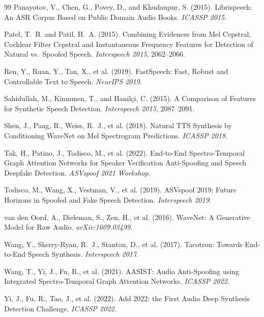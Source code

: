 \documentclass[12pt, a4paper, oneside]{report}
\begin{document}
\begin{thebibliography}{99}
Panayotov, V., Chen, G., Povey, D., and Khudanpur, S. (2015).
\newblock Librispeech: An ASR Corpus Based on Public Domain Audio Books.
\newblock \textit{ICASSP 2015}.

Patel, T.~B. and Patil, H.~A. (2015).
\newblock Combining Evidences from Mel Cepstral, Cochlear Filter Cepstral and Instantaneous Frequency Features for Detection of Natural vs.\ Spoofed Speech.
\newblock \textit{Interspeech 2015}, 2062--2066.

Ren, Y., Ruan, Y., Tan, X., et al. (2019).
\newblock FastSpeech: Fast, Robust and Controllable Text to Speech.
\newblock \textit{NeurIPS 2019}.

Sahidullah, M., Kinnunen, T., and Hanilçi, C. (2015).
\newblock A Comparison of Features for Synthetic Speech Detection.
\newblock \textit{Interspeech 2015}, 2087--2091.

Shen, J., Pang, R., Weiss, R.~J., et al. (2018).
\newblock Natural TTS Synthesis by Conditioning WaveNet on Mel Spectrogram Predictions.
\newblock \textit{ICASSP 2018}.

Tak, H., Patino, J., Todisco, M., et al. (2022).
\newblock End-to-End Spectro-Temporal Graph Attention Networks for Speaker Verification Anti-Spoofing and Speech Deepfake Detection.
\newblock \textit{ASVspoof 2021 Workshop}.

Todisco, M., Wang, X., Vestman, V., et al. (2019).
\newblock ASVspoof 2019: Future Horizons in Spoofed and Fake Speech Detection.
\newblock \textit{Interspeech 2019}.

van den Oord, A., Dieleman, S., Zen, H., et al. (2016).
\newblock WaveNet: A Generative Model for Raw Audio.
\newblock \textit{arXiv:1609.03499}.

Wang, Y., Skerry-Ryan, R.~J., Stanton, D., et al. (2017).
\newblock Tacotron: Towards End-to-End Speech Synthesis.
\newblock \textit{Interspeech 2017}.

Wang, T., Yi, J., Fu, R., et al. (2021).
\newblock AASIST: Audio Anti-Spoofing using Integrated Spectro-Temporal Graph Attention Networks.
\newblock \textit{ICASSP 2022}.

Yi, J., Fu, R., Tao, J., et al. (2022).
\newblock Add 2022: the First Audio Deep Synthesis Detection Challenge.
\newblock \textit{ICASSP 2022}.

\end{thebibliography}
\end{document}
